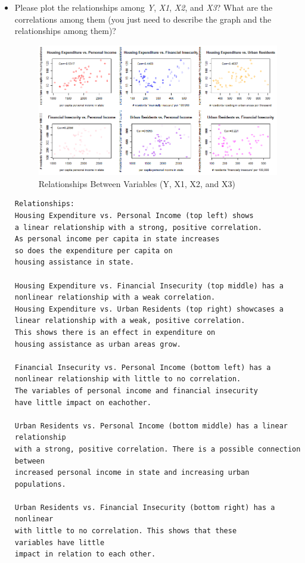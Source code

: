 \documentclass[12pt,letterpaper]{article}
\begin{document}
\begin{itemize}

\item
Please plot the relationships among \emph{Y}, \emph{X1}, \emph{X2}, and \emph{X3}? What are the correlations among them (you just need to describe the graph and the relationships among them)?
\begin{figure}[h!]\centering
	\caption{\footnotesize Relationships Between Variables (Y, X1, X2, and X3)}
	\label{fig:plot_1}
	\includegraphics[width=.85\textwidth]{all_relationships.png}
\end{figure}
\begin{Verbatim}
Relationships:
Housing Expenditure vs. Personal Income (top left) shows 
a linear relationship with a strong, positive correlation. 
As personal income per capita in state increases 
so does the expenditure per capita on 
housing assistance in state.

Housing Expenditure vs. Financial Insecurity (top middle) has a
nonlinear relationship with a weak correlation.
Housing Expenditure vs. Urban Residents (top right) showcases a
linear relationship with a weak, positive correlation. 
This shows there is an effect in expenditure on 
housing assistance as urban areas grow.

Financial Insecurity vs. Personal Income (bottom left) has a
nonlinear relationship with little to no correlation. 
The variables of personal income and financial insecurity 
have little impact on eachother.

Urban Residents vs. Personal Income (bottom middle) has a linear relationship 
with a strong, positive correlation. There is a possible connection between 
increased personal income in state and increasing urban populations.

Urban Residents vs. Financial Insecurity (bottom right) has a nonlinear 
with little to no correlation. This shows that these 
variables have little 
impact in relation to each other.


\end{Verbatim}
\end{itemize}
\end{document}
